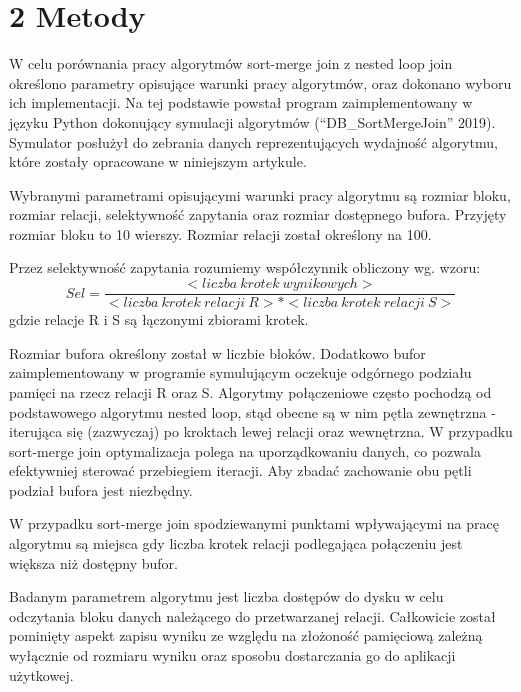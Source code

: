 \documentclass[]{article}
\begin{document}
\section{2 Metody}\label{metody}

W celu porównania pracy algorytmów sort-merge join z nested loop join
określono parametry opisujące warunki pracy algorytmów, oraz dokonano
wyboru ich implementacji. Na tej podstawie powstał program
zaimplementowany w języku Python dokonujący symulacji algorytmów
(``DB\_SortMergeJoin'' 2019). Symulator posłużył do zebrania danych
reprezentujących wydajność algorytmu, które zostały opracowane w
niniejszym artykule. \vspace{2mm}

Wybranymi parametrami opisującymi warunki pracy algorytmu są rozmiar
bloku, rozmiar relacji, selektywność zapytania oraz rozmiar dostępnego
bufora. Przyjęty rozmiar bloku to 10 wierszy. Rozmiar relacji został
określony na 100. \vspace{2mm}

Przez selektywność zapytania rozumiemy współczynnik obliczony wg. wzoru:
\[Sel=\frac{<liczba\ krotek\ wynikowych>}{<liczba\ krotek\ relacji\ R> * <liczba\ krotek\ relacji\ S>}\]
gdzie relacje R i S są łączonymi zbiorami krotek. \vspace{2mm}

Rozmiar bufora określony został w liczbie bloków. Dodatkowo bufor
zaimplementowany w programie symulującym oczekuje odgórnego podziału
pamięci na rzecz relacji R oraz S. Algorytmy połączeniowe często
pochodzą od podstawowego algorytmu nested loop, stąd obecne są w nim
pętla zewnętrzna - iterująca się (zazwyczaj) po kroktach lewej relacji
oraz wewnętrzna. W przypadku sort-merge join optymalizacja polega na
uporządkowaniu danych, co pozwala efektywniej sterować przebiegiem
iteracji. Aby zbadać zachowanie obu pętli podział bufora jest niezbędny.
\vspace{2mm}

W przypadku sort-merge join spodziewanymi punktami wpływającymi na pracę
algorytmu są miejsca gdy liczba krotek relacji podlegająca połączeniu
jest większa niż dostępny bufor. \vspace{2mm}

Badanym parametrem algorytmu jest liczba dostępów do dysku w celu
odczytania bloku danych należącego do przetwarzanej relacji. Całkowicie
został pominięty aspekt zapisu wyniku ze względu na złożoność pamięciową
zależną wyłącznie od rozmiaru wyniku oraz sposobu dostarczania go do
aplikacji użytkowej. \vspace{2mm}
\end{document}
